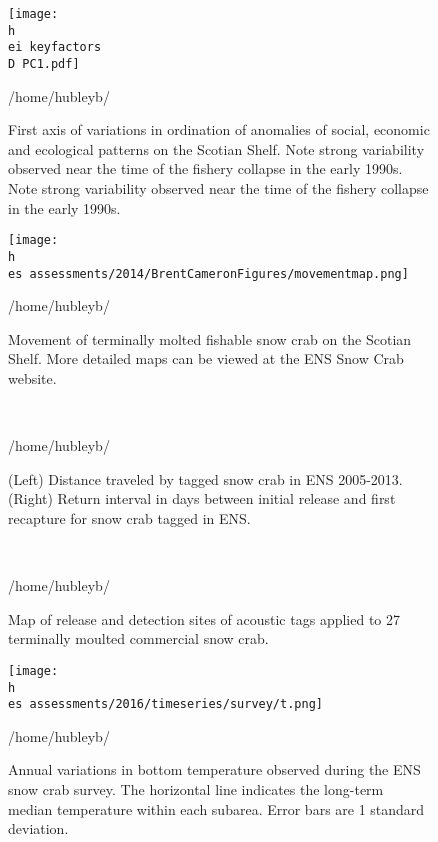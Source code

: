 \documentclass[11pt]{article}
\newcommand{\D}{.}
\newcommand{\h}{/home/hubleyb/}
\newcommand{\es}{bio.data/bio.snowcrab/}
\newcommand{\ei}{bio.data/bio.indicators/}
\begin{document}
\begin{figure}
\centering
\texttt{[image: \\h \\ei keyfactors\\D PC1.pdf]}
\caption{First axis of variations in ordination of anomalies of social, economic and ecological patterns on the Scotian Shelf. Note strong variability observed near the time of the fishery collapse in the early 1990s. Note strong variability observed near the time of the fishery collapse in the early 1990s.}
\h \end{figure}
\clearpage



\begin{figure}
\centering
\texttt{[image: \\h \\es assessments/2014/BrentCameronFigures/movementmap.png]}
\caption{Movement of terminally molted fishable snow crab on the Scotian Shelf. More detailed maps can be viewed at the ENS Snow Crab website.}
\h \end{figure}

\begin{figure}
\centering
{}\
\\

\caption{(Left) Distance traveled by tagged snow crab in ENS 2005-2013. (Right) Return interval in days between initial release and first recapture for snow crab tagged in ENS.}
\h \end{figure}
\clearpage


\begin{figure}
\centering
{}\

\caption{Map of release and detection sites of acoustic tags applied to 27 terminally moulted commercial snow crab.}
\h \end{figure}
\clearpage


\begin{figure}
\centering
\texttt{[image: \\h \\es assessments/2016/timeseries/survey/t.png]} %
\caption{Annual variations in bottom temperature observed during the ENS snow crab survey. The horizontal line indicates the long-term median temperature within each subarea. Error bars are 1 standard deviation. }
\h \end{figure}
\clearpage
\end{document}
